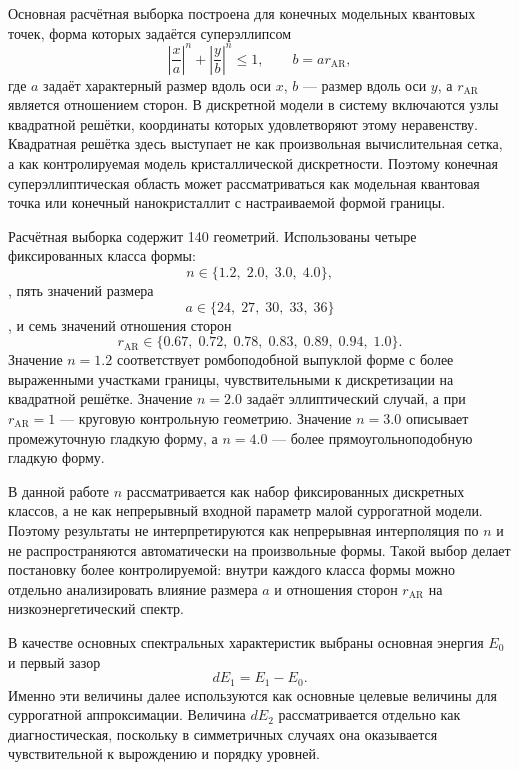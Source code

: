 Основная расчётная выборка построена для конечных модельных квантовых точек, форма которых
задаётся суперэллипсом
\begin{equation}
  \left|\frac{x}{a}\right|^n
  +
  \left|\frac{y}{b}\right|^n
  \leq 1,
  \qquad
  b = a r_{\mathrm{AR}},
\end{equation}
где $a$ задаёт характерный размер вдоль оси $x$, $b$ --- размер вдоль оси $y$, а
$r_{\mathrm{AR}}$ является отношением сторон. В дискретной модели в систему включаются
узлы квадратной решётки, координаты которых удовлетворяют этому неравенству. Квадратная
решётка здесь выступает не как произвольная вычислительная сетка, а как контролируемая
модель кристаллической дискретности. Поэтому конечная суперэллиптическая область может
рассматриваться как модельная квантовая точка или конечный нанокристаллит с настраиваемой
формой границы.

Расчётная выборка содержит 140 геометрий. Использованы четыре фиксированных класса формы:
\[
  n \in \{1.2,\;2.0,\;3.0,\;4.0\},
\],
пять значений размера
\[
  a \in \{24,\;27,\;30,\;33,\;36\}
\],
и семь значений отношения сторон
\[
  r_{\mathrm{AR}} \in \{0.67,\;0.72,\;0.78,\;0.83,\;0.89,\;0.94,\;1.0\}.
\]
Значение $n=1.2$ соответствует ромбоподобной выпуклой форме с более выраженными участками
границы, чувствительными к дискретизации на квадратной решётке. Значение $n=2.0$ задаёт
эллиптический случай, а при $r_{\mathrm{AR}}=1$ --- круговую контрольную геометрию.
Значение $n=3.0$ описывает промежуточную гладкую форму, а $n=4.0$ --- более
прямоугольноподобную гладкую форму.

В данной работе $n$ рассматривается как набор фиксированных дискретных классов, а не как
непрерывный входной параметр малой суррогатной модели. Поэтому результаты не
интерпретируются как непрерывная интерполяция по $n$ и не распространяются автоматически
на произвольные формы. Такой выбор делает постановку более контролируемой: внутри каждого
класса формы можно отдельно анализировать влияние размера $a$ и отношения сторон
$r_{\mathrm{AR}}$ на низкоэнергетический спектр.

В качестве основных спектральных характеристик выбраны основная энергия $E_0$ и первый
зазор
\begin{equation}
  dE_1 = E_1 - E_0 .
\end{equation}
Именно эти величины далее используются как основные целевые величины для суррогатной
аппроксимации. Величина $dE_2$ рассматривается отдельно как диагностическая, поскольку в
симметричных случаях она оказывается чувствительной к вырождению и порядку уровней.

